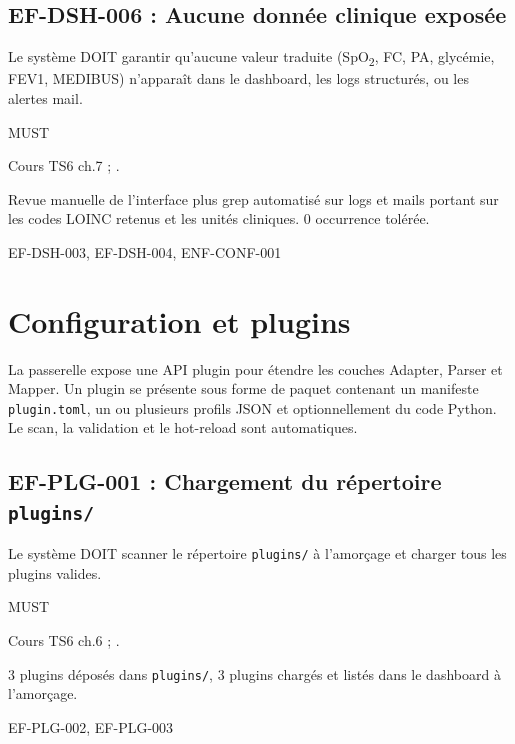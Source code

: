 \subsection*{EF-DSH-006 : Aucune donnée clinique exposée}
\begin{description}[leftmargin=2.5cm, style=nextline]
  \item[Énoncé] Le système DOIT garantir qu'aucune valeur traduite (SpO\textsubscript{2}, FC, PA, glycémie, FEV1, MEDIBUS) n'apparaît dans le dashboard, les logs structurés, ou les alertes mail.
  \item[Priorité] MUST
  \item[Source] Cours TS6 ch.7 ; \cite{ihe_pcd_tf}.
  \item[Recette] Revue manuelle de l'interface plus grep automatisé sur logs et mails portant sur les codes LOINC retenus et les unités cliniques. 0 occurrence tolérée.
  \item[Lié à] EF-DSH-003, EF-DSH-004, ENF-CONF-001
\end{description}

\section{Configuration et plugins}
\label{sec:ef-plugins}

La passerelle expose une API plugin pour étendre les couches Adapter, Parser et Mapper. Un plugin se présente sous forme de paquet contenant un manifeste \texttt{plugin.toml}, un ou plusieurs profils JSON et optionnellement du code Python. Le scan, la validation et le hot-reload sont automatiques.

\subsection*{EF-PLG-001 : Chargement du répertoire \texttt{plugins/}}
\begin{description}[leftmargin=2.5cm, style=nextline]
  \item[Énoncé] Le système DOIT scanner le répertoire \texttt{plugins/} à l'amorçage et charger tous les plugins valides.
  \item[Priorité] MUST
  \item[Source] Cours TS6 ch.6 ; \cite{ihe_pcd_tf}.
  \item[Recette] 3 plugins déposés dans \texttt{plugins/}, 3 plugins chargés et listés dans le dashboard à l'amorçage.
  \item[Lié à] EF-PLG-002, EF-PLG-003
\end{description}

